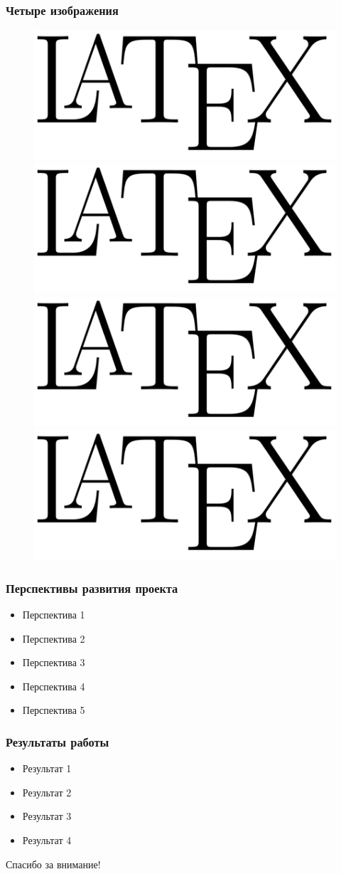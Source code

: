 \documentclass[14pt]{beamer}
\begin{document}
\begin{frame}
\frametitle{Четыре изображения}
\begin{figure}[H]
  \center
    \includegraphics[width=0.4\linewidth]{latex}
    \includegraphics[width=0.4\linewidth]{latex}\\
    \includegraphics[width=0.4\linewidth]{latex}
    \includegraphics[width=0.4\linewidth]{latex}
\end{figure}
\end{frame}

\begin{frame}
\frametitle{Перспективы развития проекта}
\begin{itemize}
  \item Перспектива 1
  \item Перспектива 2
  \item Перспектива 3
  \item Перспектива 4
  \item Перспектива 5
\end{itemize}
\end{frame}

\begin{frame}
\frametitle{Результаты работы}
\begin{itemize}
  \item Результат 1
  \item Результат 2
  \item Результат 3
  \item Результат 4
\end{itemize}
\end{frame}

\begin{frame}
\begin{center}
Спасибо за внимание!
\end{center}
\end{frame}
\end{document}
